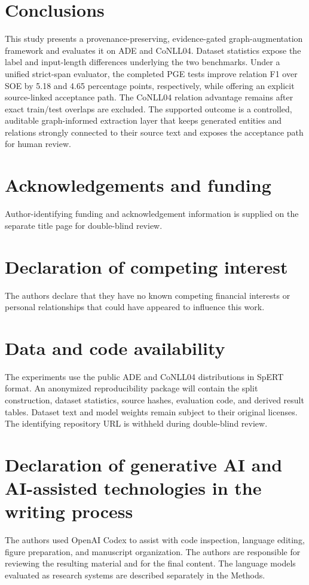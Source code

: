 \documentclass[preprint,12pt]{elsarticle}
\begin{document}
\section{Conclusions}
\label{sec:conclusion}
This study presents a provenance-preserving, evidence-gated graph-augmentation
framework and evaluates it on ADE and CoNLL04. Dataset statistics expose the
label and input-length differences underlying the two benchmarks. Under a
unified strict-span evaluator, the completed PGE tests improve relation F1
over SOE by 5.18 and 4.65 percentage points, respectively, while offering an
explicit source-linked acceptance path. The CoNLL04 relation advantage remains
after exact train/test overlaps are excluded. The supported outcome is a
controlled, auditable graph-informed extraction layer that keeps generated
entities and relations strongly connected to their source text and exposes the
acceptance path for human review.

\section*{Acknowledgements and funding}
Author-identifying funding and acknowledgement information is supplied on the
separate title page for double-blind review.
\section*{Declaration of competing interest}
The authors declare that they have no known competing financial interests or
personal relationships that could have appeared to influence this work.
\section*{Data and code availability}
The experiments use the public ADE and CoNLL04 distributions in SpERT format.
An anonymized reproducibility package will contain the split construction,
dataset statistics, source hashes, evaluation code, and derived result tables.
Dataset text and model weights remain subject to their original licenses.
The identifying repository URL is withheld during double-blind review.
\section*{Declaration of generative AI and AI-assisted technologies in the writing process}
The authors used OpenAI Codex to assist with code inspection, language editing,
figure preparation, and manuscript organization. The authors are responsible
for reviewing the resulting material and for the final content. The language
models evaluated as research systems are described separately in the Methods.



\end{document}
